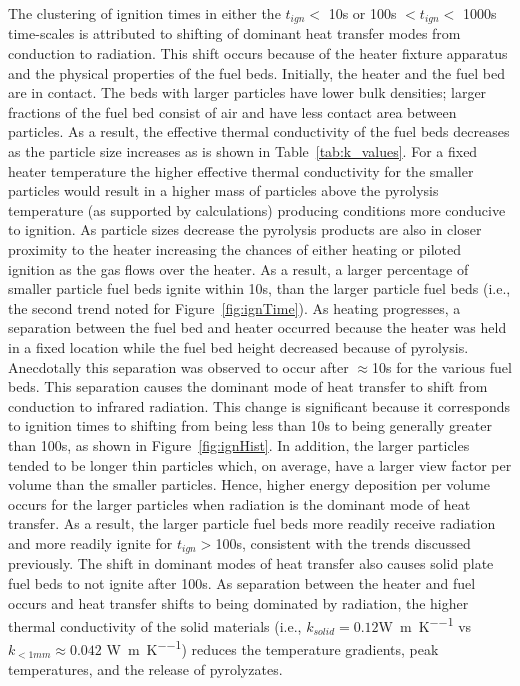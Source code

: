     The clustering of ignition times in either the $t_{ign} <$ 10\si{\second} or 100\si{\second}  $<t_{ign}<$ 1000\si{\second} time-scales is attributed to shifting of dominant heat transfer modes from conduction to radiation.  This shift occurs because of the heater fixture apparatus and the physical properties of the fuel beds. Initially, the heater and the fuel bed are in contact. The beds with larger particles have lower bulk densities; larger fractions of the fuel bed consist of air and have less contact area between particles. As a result, the effective thermal conductivity of the fuel beds decreases as the particle size increases as is shown in Table~\ref{tab:k_values}. For a fixed heater temperature the higher effective thermal conductivity for the smaller particles would result in a higher mass of particles above the pyrolysis temperature (as supported by calculations) producing conditions more conducive to ignition. As particle sizes decrease the pyrolysis products are also in closer proximity to the heater increasing the chances of either heating or piloted ignition as the gas flows over the heater. As a result, a larger percentage of smaller particle fuel beds ignite within 10\si{\second}, than the larger particle fuel beds (i.e., the second trend noted for Figure~\ref{fig:ignTime}). As heating progresses, a separation between the fuel bed and heater occurred because the heater was held in a fixed location while the fuel bed height decreased because of pyrolysis. Anecdotally this separation was observed to occur after $\approx$10\si{\second} for the various fuel beds. This separation causes the dominant mode of heat transfer to shift from conduction to infrared radiation. This change is significant because it corresponds to  ignition times to shifting from being less than 10\si{\second} to being generally greater than 100\si{\second}, as shown in Figure~\ref{fig:ignHist}. In addition, the larger particles tended to be longer thin particles which, on average, have a larger view factor per volume than the smaller particles. Hence, higher energy deposition per volume occurs for the larger particles when radiation is the dominant mode of heat transfer. As a result, the larger particle fuel beds more readily receive radiation and more readily ignite for $t_{ign} >$100\si{\second}, consistent with the trends discussed previously. The shift in dominant modes of heat transfer also causes solid plate fuel beds to not ignite after 100\si{\second}.  As separation between the heater and fuel occurs and heat transfer shifts to being dominated by radiation, the higher thermal conductivity of the solid materials (i.e., $k_{solid}=0.12$\si{\watt\per\meter\per\kelvin} vs $k_{<1mm} \approx 0.042$ \si{\watt\per\meter\per\kelvin}) reduces the temperature gradients, peak temperatures, and the release of pyrolyzates. 
    

